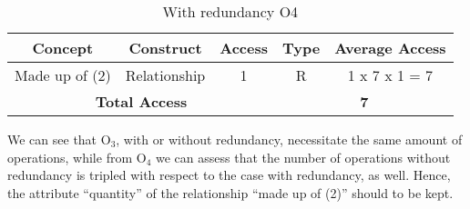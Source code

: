 \begin{table}[!h]\caption{With redundancy O4}
	\begin{center}
		\begin{tabular}{| c | c | c | c | c |}
			\hline
			\textbf{Concept} & \textbf{Construct} & \textbf{Access} & \textbf{Type} & \textbf{Average Access} \\ \hline
			Made up of (2) & Relationship & 1 & R & 1 x 7 x 1 = 7 \\ \hline	
			\multicolumn{3}{|c|}{\textbf{Total Access}} & \multicolumn{2}{|c|}{\textbf{7}} \\ \hline
		\end{tabular}
	\end{center}
\end{table}
We can see that $ \textrm{O}_\textrm{3} $, with or without redundancy, necessitate the same amount of operations, while from $ \textrm{O}_\textrm{4} $ we can assess that the number of operations without redundancy is tripled with respect to the case with redundancy, as well. Hence, the attribute ``quantity'' of the relationship ``made up of (2)'' should to be kept.